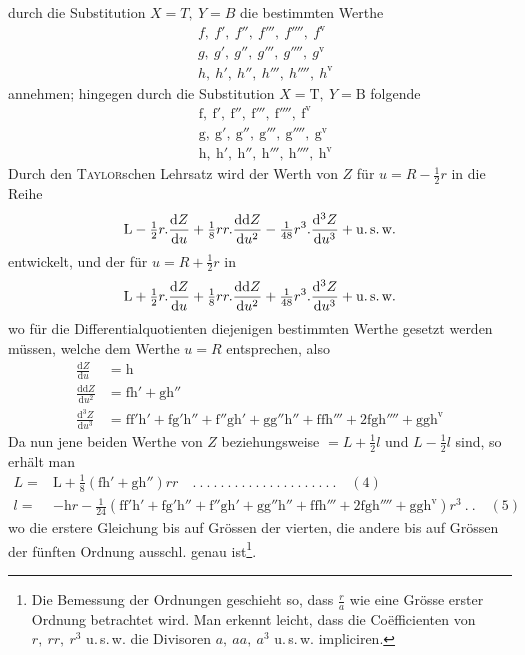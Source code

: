 %
durch die Substitution \(X=T,\ Y=B\) die bestimmten Werthe
\[
\begin{aligned}
&f,\ f',\ f'',\ f''',\ f'''',\ f^{\mathrm{v}}\\
&g,\ g',\ g'',\ g''',\ g'''',\ g^{\mathrm{v}}\\
&h,\ h',\ h'',\ h''',\ h'''',\ h^{\mathrm{v}}
\end{aligned}
\]
annehmen; hingegen durch die Substitution \(X=\mathrm{T},\ Y=\mathrm{B}\) folgende
\[
\begin{aligned}
&\mathrm{f},\ \mathrm{f}',\ \mathrm{f}'',\ \mathrm{f}''',\ \mathrm{f}'''',\ \mathrm{f}^{\mathrm{v}}\\
&\mathrm{g},\ \mathrm{g}',\ \mathrm{g}'',\ \mathrm{g}''',\ \mathrm{g}'''',\ \mathrm{g}^{\mathrm{v}}\\
&\mathrm{h},\ \mathrm{h}',\ \mathrm{h}'',\ \mathrm{h}''',\ \mathrm{h}'''',\ \mathrm{h}^{\mathrm{v}}
\end{aligned}
\]
Durch den \textsc{Taylor}schen Lehrsatz wird der Werth von \(Z\) für \(u=R-\frac12r\) in die Reihe
\[
\mathrm{L}-\tfrac12r\mathord{.}\frac{\mathrm{d}Z}{\mathrm{d}u}+\tfrac18rr\mathord{.}\frac{\mathrm{dd}Z}{\mathrm{d}u^2}-\tfrac1{48}r^3\mathord{.}\frac{\mathrm{d}^3Z}{\mathrm{d}u^3}+\text{u.\,s.\,w.}
\]
entwickelt, und der für \(u=R+\frac12r\) in
\[
\mathrm{L}+\tfrac12r\mathord{.}\frac{\mathrm{d}Z}{\mathrm{d}u}+\tfrac18rr\mathord{.}\frac{\mathrm{dd}Z}{\mathrm{d}u^2}+\tfrac1{48}r^3\mathord{.}\frac{\mathrm{d}^3Z}{\mathrm{d}u^3}+\text{u.\,s.\,w.}
\]
wo für die Differentialquotienten diejenigen bestimmten Werthe gesetzt werden müssen, welche dem Werthe \(u=R\) entsprechen, also
\[
\begin{aligned}
\frac{\mathrm{d}Z}{\mathrm{d}u}&=\mathrm{h}\\
\frac{\mathrm{dd}Z}{\mathrm{d}u^2}&=\mathrm{fh}'+\mathrm{gh}''\\
\frac{\mathrm{d}^3Z}{\mathrm{d}u^3}&=\mathrm{ff'h}'+\mathrm{fg'h}''+\mathrm{f''gh}'+\mathrm{gg''h}''+\mathrm{ffh}'''+2\mathrm{fgh}''''+\mathrm{ggh}^{\mathrm{v}}
\end{aligned}
\]
Da nun jene beiden Werthe von \(Z\) beziehungsweise \(=L+\frac12l\) und \(L-\frac12l\) sind, so erhält man
\begingroup\fontsize{10}{12}\selectfont
\[
\begin{aligned}
L={}&\mathrm{L}+\tfrac18(\mathrm{fh}'+\mathrm{gh}'')rr\quad .\ .\ .\ .\ .\ .\ .\ .\ .\ .\ .\ .\ .\ .\ .\ .\ .\ .\ .\ .\ .\quad(4)\\
l={}&-\mathrm{h}r-\tfrac1{24}(\mathrm{ff'h}'+\mathrm{fg'h}''+\mathrm{f''gh}'+\mathrm{gg''h}''+\mathrm{ffh}'''+2\mathrm{fgh}''''+\mathrm{ggh}^{\mathrm{v}})r^3\ .\ .\quad(5)
\end{aligned}
\]
\endgroup
wo die erstere Gleichung bis auf Grössen der vierten, die andere bis auf Grössen der fünften Ordnung ausschl. genau ist\footnote{Die Bemessung der Ordnungen geschieht so, dass \(\frac ra\) wie eine Grösse erster Ordnung betrachtet wird. Man erkennt leicht, dass die Coëfficienten von \(r,\ rr,\ r^3\) u.\,s.\,w. die Divisoren \(a,\ aa,\ a^3\) u.\,s.\,w. impliciren.}.
